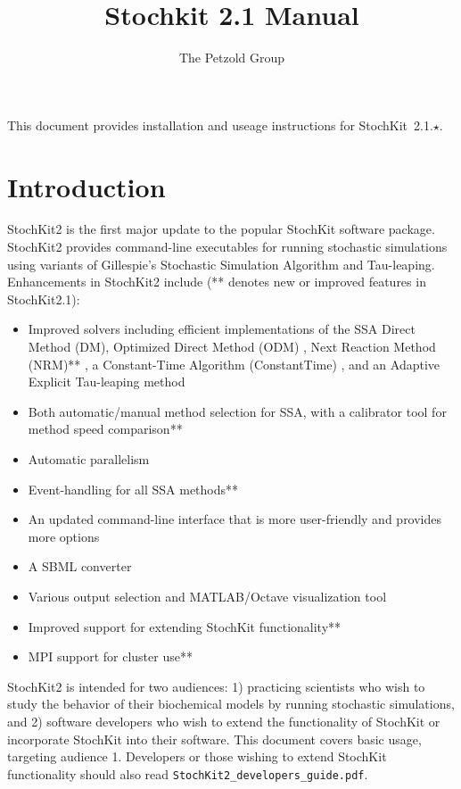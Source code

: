 \documentclass[11pt,letterpaper]{article}
\title{Stochkit 2.1 Manual}
\author{The Petzold Group}
\begin{document}
\sloppy %
\singlespacing
\pagestyle{mainmatter}

\maketitle

This document provides installation and useage instructions for StochKit~2.1.$\star$.

\clearpage

{\pagestyle{plain}
\singlespace
\tableofcontents
\listoffigures
\listoftables
}

\clearpage
\section{Introduction}

StochKit2 is the first major update to the popular StochKit software package.  StochKit2 provides command-line executables for running stochastic simulations using variants of Gillespie’s Stochastic Simulation Algorithm and Tau-leaping.  Enhancements in StochKit2 include (** denotes new or improved features in StochKit2.1):
\begin{itemize}
    \item Improved solvers including efficient implementations of the SSA Direct Method (DM), Optimized Direct Method (ODM) \cite{Cao2004}, Next Reaction Method (NRM)** \cite{Gibson2000}, a Constant-Time Algorithm (ConstantTime) \cite{Slepoy2008}, and an Adaptive Explicit Tau-leaping method
    \item Both automatic/manual method selection for SSA, with a calibrator tool for method speed comparison**
    \item Automatic parallelism
    \item Event-handling for all SSA methods**
    \item An updated command-line interface that is more user-friendly and provides more options
    \item A SBML converter
    \item Various output selection and MATLAB/Octave visualization tool
    \item Improved support for extending StochKit functionality**
    \item MPI support for cluster use**
\end{itemize}

StochKit2 is intended for two audiences: 1) practicing scientists who wish to study the behavior of their biochemical models by running stochastic simulations, and 2) software developers who wish to extend the functionality of StochKit or incorporate StochKit into their software.
This document covers basic usage, targeting audience 1.  Developers or those wishing to extend StochKit functionality should also read \texttt{StochKit2\_developers\_guide.pdf}.
\end{document}

